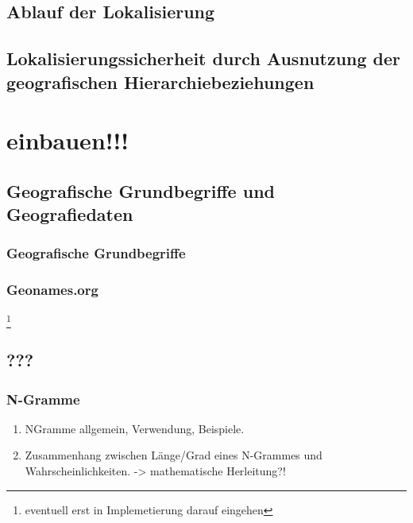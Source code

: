 	\subsection{Ablauf der Lokalisierung}
	
	\subsection{Lokalisierungssicherheit durch Ausnutzung der geografischen Hierarchiebeziehungen}


\section*{einbauen!!!}
\subsection{Geografische Grundbegriffe und Geografiedaten}

		\subsubsection{Geografische Grundbegriffe}

		\subsubsection{Geonames.org} \footnote{eventuell erst in Implemetierung darauf eingehen} 
			

		\subsubsection{}	

	\subsection{???} 
		\subsubsection{N-Gramme}
			\begin{enumerate}
				\item NGramme allgemein, Verwendung, Beispiele. 
				\item {} Zusammenhang zwischen Länge/Grad eines N-Grammes und Wahrscheinlichkeiten. -> mathematische Herleitung?!
			\end{enumerate}






